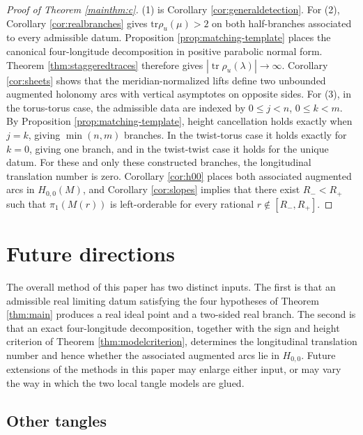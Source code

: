 \documentclass{article}
\DeclareMathOperator{\tr}{tr}
\theoremstyle{plain}
\theoremstyle{definition}
\theoremstyle{plain}
\theoremstyle{plain}
\theoremstyle{plain}
\theoremstyle{remark}
\theoremstyle{remark}
\theoremstyle{plain}
\theoremstyle{plain}
\newcounter{main}
\theoremstyle{plain}
\theoremstyle{plain}
\begin{document}
\begin{proof}[Proof of Theorem \ref{mainthm:c}]
(1) is Corollary \ref{cor:generaldetection}. For (2), Corollary \ref{cor:realbranches} gives $\mathrm{tr}\rho_u(\mu) > 2$ on both half-branches associated to every admissible datum. Proposition \ref{prop:matching-template} places the canonical four-longitude decomposition in positive parabolic normal form. Theorem \ref{thm:staggeredtraces} therefore gives $|\tr\rho_u(\lambda)| \to \infty$. Corollary \ref{cor:sheets} shows that the meridian-normalized lifts define two unbounded augmented holonomy arcs with vertical asymptotes on opposite sides. For (3), in the torus-torus case, the admissible data are indexed by $0 \leq j < n$, $0 \leq k < m$. By Proposition \ref{prop:matching-template}, height cancellation holds exactly when $j=k$, giving $\min(n,m)$ branches. In the twist-torus case it holds exactly for $k=0$, giving one branch, and in the twist-twist case it holds for the unique datum. For these and only these constructed branches, the longitudinal translation number is zero. Corollary \ref{cor:h00} places both associated augmented arcs in $H_{0,0}(M)$, and Corollary \ref{cor:slopes} implies that there exist $R_- < R_+$ such that $\pi_1(M(r))$ is left-orderable for every rational $r \notin [R_-, R_+]$.
\end{proof}

\section{Future directions}\label{sec:future}

The overall method of this paper has two distinct inputs. The first is that an admissible real limiting datum satisfying the four hypotheses of Theorem \ref{thm:main} produces a real ideal point and a two-sided real branch. The second is that an exact four-longitude decomposition, together with the sign and height criterion of Theorem \ref{thm:modelcriterion}, determines the longitudinal translation number and hence whether the associated augmented arcs lie in $H_{0, 0}$. Future extensions of the methods in this paper may enlarge either input, or may vary the way in which the two local tangle models are glued. 

\subsection{Other tangles}
\end{document}
